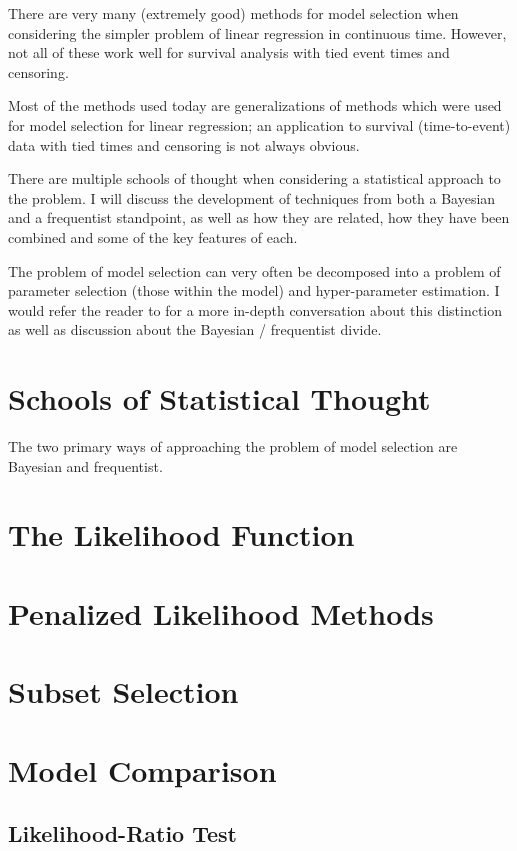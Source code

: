 There are very many (extremely good) methods for model selection when considering the simpler problem of linear regression in continuous time. However, not all of these work well for survival analysis with tied event times and censoring.

Most of the methods used today are generalizations of methods which were used for model selection for linear regression; an application to survival (time-to-event) data with tied times and censoring is not always obvious.

There are multiple schools of thought when considering a statistical approach to the problem. I will discuss the development of techniques from both a Bayesian and a frequentist standpoint, as well as how they are related, how they have been combined and some of the key features of each.

The problem of model selection can very often be decomposed into a problem of parameter selection (those within the model) and hyper-parameter estimation. I would refer the reader to \cite{bayesian-frequentist} for a more in-depth conversation about this distinction as well as discussion about the Bayesian / frequentist divide.

\section{Schools of Statistical Thought}

The two primary ways of approaching the problem of model selection are Bayesian and frequentist. 

\section{The Likelihood Function}



\section{Penalized Likelihood Methods}
\section{Subset Selection}
\section{Model Comparison} 
\subsection{Likelihood-Ratio Test}
